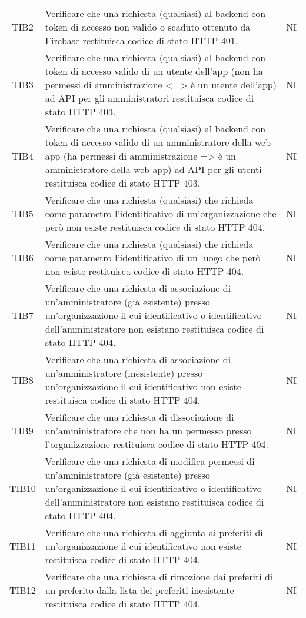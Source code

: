 {\begin{longtable}{ c C{13cm} C{1cm}}
TIB2 & Verificare che una richiesta (qualsiasi) al backend con token di accesso non valido o scaduto ottenuto da Firebase restituisca codice di stato HTTP 401. & NI \\
TIB3 & Verificare che una richiesta (qualsiasi) al backend con token di accesso valido di un utente dell'app (non ha permessi di amministrazione <=> è un utente dell'app) ad API per gli amministratori restituisca codice di stato HTTP 403. & NI \\
TIB4 & Verificare che una richiesta (qualsiasi) al backend con token di accesso valido di un amministratore della web-app (ha permessi di amministrazione => è un amministratore della web-app) ad API per gli utenti restituisca codice di stato HTTP 403. & NI \\
TIB5 & Verificare che una richiesta (qualsiasi) che richieda come parametro l'identificativo di un'organizzazione che però non esiste restituisca codice di stato HTTP 404. & NI \\
TIB6 & Verificare che una richiesta (qualsiasi) che richieda come parametro l'identificativo di un luogo che però non esiste restituisca codice di stato HTTP 404. & NI \\
TIB7 & Verificare che una richiesta di associazione di un'amministratore (già esistente) presso un'organizzazione il cui identificativo o identificativo dell'amministratore non esistano restituisca codice di stato HTTP 404. & NI \\
TIB8 & Verificare che una richiesta di associazione di un'amministratore (inesistente) presso un'organizzazione il cui identificativo non esiste restituisca codice di stato HTTP 404. & NI \\
TIB9 & Verificare che una richiesta di dissociazione di un'amministratore che non ha un permesso presso l'organizzazione restituisca codice di stato HTTP 404. & NI \\
TIB10 & Verificare che una richiesta di modifica permessi di un'amministratore (già esistente) presso un'organizzazione il cui identificativo o identificativo dell'amministratore non esistano restituisca codice di stato HTTP 404. & NI \\
TIB11 & Verificare che una richiesta di aggiunta ai preferiti di un'organizzazione il cui identificativo non esiste restituisca codice di stato HTTP 404. & NI \\
TIB12 & Verificare che una richiesta di rimozione dai preferiti di un preferito dalla lista dei preferiti inesistente restituisca codice di stato HTTP 404. & NI \\

\end{longtable}}
